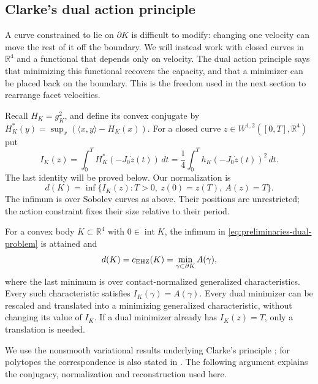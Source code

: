 \subsection{Clarke's dual action principle}
\label{subsec:preliminaries-clarke-dual-action-principle}

A curve constrained to lie on $\partial K$ is difficult to modify: changing
one velocity can move the rest of it off the boundary. We will instead work
with closed curves in $\mathbb R^4$ and a functional that depends only on
velocity. The dual action principle says that minimizing this functional
recovers the capacity, and that a minimizer can be placed back on the
boundary. This is the freedom used in the next section to rearrange facet
velocities.

Recall $H_K=g_K^2$, and define its convex conjugate by
$H_K^*(y)=\sup_x(\langle x,y\rangle-H_K(x))$. For a closed curve
$z\in W^{1,2}([0,T],\mathbb R^4)$ put
\begin{equation}\label{eq:preliminaries-dual-functional}
 I_K(z)=\int_0^T H_K^*(-J_0\dot z(t))\,dt
       =\frac14\int_0^T h_K(-J_0\dot z(t))^2\,dt.
\end{equation}
The last identity will be proved below. Our normalization is
\begin{equation}\label{eq:preliminaries-dual-problem}
 d(K)=\inf\{I_K(z):T>0,\ z(0)=z(T),\ A(z)=T\}.
\end{equation}
The infimum is over Sobolev curves as above. Their positions are unrestricted;
the action constraint fixes their size relative to their period.

\begin{theorem}
\label{thm:preliminaries-clarke-dual-action}
For a convex body $K\subset\mathbb R^4$ with $0\in\operatorname{int}K$,
the infimum in \eqref{eq:preliminaries-dual-problem} is attained and
\[
 d(K)=c_{\rm EHZ}(K)
     =\min_{\gamma\subset\partial K}A(\gamma),
\]
where the last minimum is over contact-normalized generalized
characteristics. Every such characteristic satisfies $I_K(\gamma)=A(\gamma)$.
Every dual minimizer can be rescaled and translated into a minimizing
generalized characteristic, without changing its value of $I_K$.
If a dual minimizer already has $I_K(z)=T$, only a translation is needed.
\end{theorem}

We use the nonsmooth variational results underlying Clarke's principle
\cite[Proposition~2.5 and Lemmas~5.1--5.2]{AAO2014}; for polytopes the
correspondence is also stated in \cite[Lemma~2.1]{HK2017}. The following
argument explains the conjugacy, normalization and reconstruction used here.


